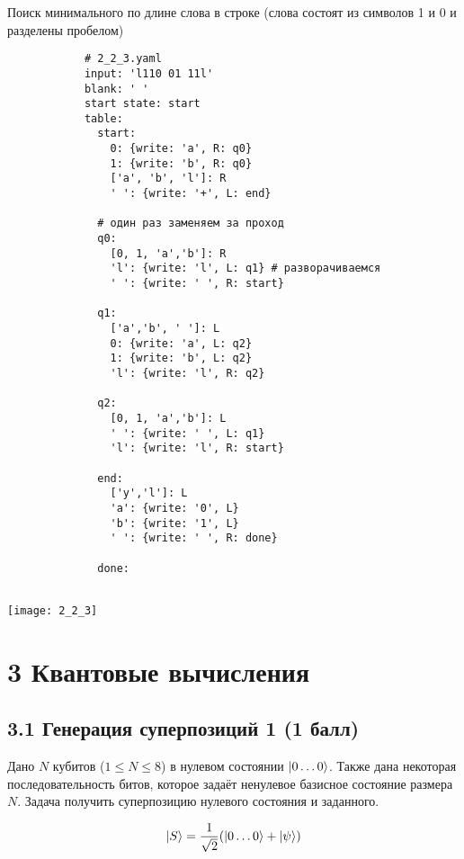 \documentclass[a4paper,12pt]{article}
\DeclarePairedDelimiter\ket{\lvert}{\rangle}
\begin{document}
        Поиск минимального по длине слова в строке (слова состоят из символов 1 и 0 и разделены пробелом)
        \begin{verbatim}
            # 2_2_3.yaml
            input: 'l110 01 11l'
            blank: ' '
            start state: start
            table:
              start:
                0: {write: 'a', R: q0}
                1: {write: 'b', R: q0}
                ['a', 'b', 'l']: R
                ' ': {write: '+', L: end}
                
              # один раз заменяем за проход
              q0:
                [0, 1, 'a','b']: R
                'l': {write: 'l', L: q1} # разворачиваемся
                ' ': {write: ' ', R: start}
                  
              q1:
                ['a','b', ' ']: L
                0: {write: 'a', L: q2}
                1: {write: 'b', L: q2}
                'l': {write: 'l', R: q2}
              
              q2:
                [0, 1, 'a','b']: L
                ' ': {write: ' ', L: q1}
                'l': {write: 'l', R: start}
              
              end:
                ['y','l']: L
                'a': {write: '0', L}
                'b': {write: '1', L}
                ' ': {write: ' ', R: done}
                
              done:
    
        \end{verbatim}
        \begin{center}
            \texttt{[image: 2\_2\_3]} \\
        \end{center}
        
    \section*{3 Квантовые вычисления}
    \subsection*{3.1 Генерация суперпозиций 1 (1 балл)}
     Дано $N$ кубитов ($1 \le N \le 8$) в нулевом состоянии $\ket{0\dots0}$. 
    Также дана некоторая последовательность битов, которое задаёт ненулевое базисное состояние размера $N$. Задача получить суперпозицию нулевого состояния и заданного.
    
    $$\ket{S} = \frac{1}{\sqrt2}(\ket{0\dots0} +\ket{\psi})$$
    
\end{document}
